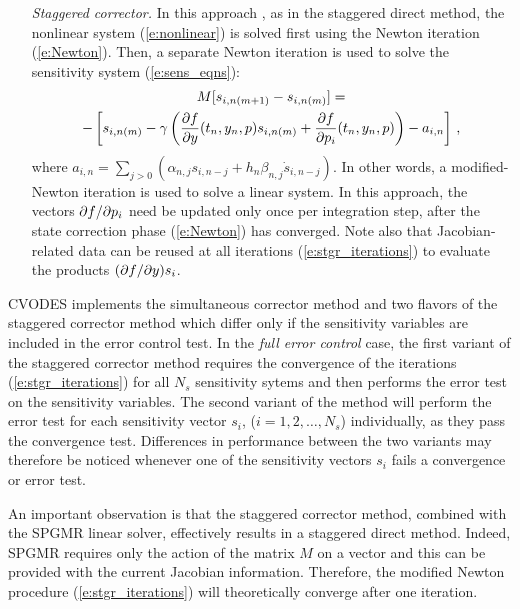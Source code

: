 \begin{itemize}
\item[{\em Staggered corrector.}] In this approach \cite{FTB:97}, as in the staggered direct method,
  the nonlinear system (\ref{e:nonlinear}) is solved first using the Newton iteration
  (\ref{e:Newton}). Then, a separate Newton iteration is used to solve the
  sensitivity system (\ref{e:sens_eqns}):
  \begin{multline}\label{e:stgr_iterations}
    M [s_{i , n(m+1)} - s_{i , n(m)}]= \\
    - \left[ s_{i, n(m)} - 
    \gamma \left( \frac{\partial f}{\partial y} (t_n , y_n, p) s_{i , n(m)} + \frac{\partial f}{\partial p_i} (t_n , y_n , p) \right)
    -a_{i,n} \right] \, ,
  \end{multline}
  where $a_{i,n} = \sum_{j>0}(\alpha_{n,j}s_{i , n-j}+h_n\beta_{n,j}\dot{s}_{i , n-j})$.
  In other words, a modified-Newton iteration is used to solve a linear system.
  In this approach, the vectors $\partial f / \partial p_i$ need be updated only once per integration step, 
  after the state correction phase (\ref{e:Newton}) has converged. Note also that 
  Jacobian-related data can be reused at all iterations (\ref{e:stgr_iterations})
  to evaluate the products $(\partial f / \partial y) s_i$.
\end{itemize}  

CVODES implements the simultaneous corrector method and two flavors of the 
staggered corrector method which differ only if the sensitivity variables are
included in the error control test.
In the {\em full error control} case, 
the first variant of the staggered corrector method requires the convergence of 
the iterations (\ref{e:stgr_iterations}) for all $N_s$ sensitivity sytems and then 
performs the error test on the sensitivity variables. The second variant of the method
will perform the error test for each sensitivity vector $s_i$, ($i=1,2,\ldots,N_s$)
individually, as they pass the convergence test. Differences in performance
between the two variants may therefore be noticed whenever one of the sensitivity 
vectors $s_i$ fails a convergence or error test. 

An important observation is that the staggered corrector method, combined with 
the SPGMR linear solver, effectively results in a staggered direct method. 
Indeed, SPGMR requires only the action of the matrix $M$ on a vector and
this can be provided with the current Jacobian information. Therefore, the
modified Newton procedure (\ref{e:stgr_iterations}) will theoretically converge 
after one iteration.

